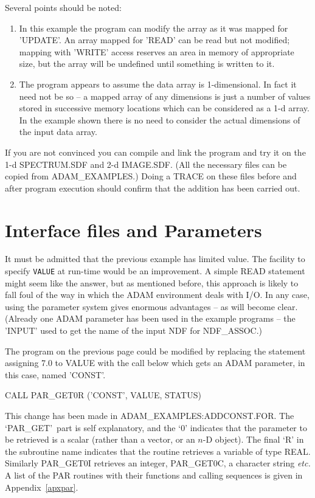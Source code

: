 \documentclass[twoside,11pt,nolof]{starlink}
\begin{document}
Several points should be noted:
\begin{enumerate}
\item In this example the program can modify the array as it was mapped for
'UPDATE'.
An array mapped for 'READ' can  be read but not modified;
mapping with  'WRITE' access reserves an area in memory of appropriate
size, but the array will be undefined until something is written to it.
\item The program appears to assume the data array is 1-dimensional.
In fact it need not be so -- a mapped array of any dimensions is just
a number of values stored in successive memory locations which  can
be considered as a 1-d array.
In the example shown there is no need to consider the actual dimensions
of the input data array.
\end{enumerate}
If you are not convinced you can compile and link the program and try it
on the 1-d SPECTRUM.SDF and 2-d IMAGE.SDF.  (All the necessary files can be
copied from ADAM\_EXAMPLES.)
Doing a TRACE on these files before and after program execution should
confirm that the addition has been carried out.

\newpage
\section{Interface files and Parameters\label{addconst}}

It must be admitted that the previous example has limited value.
The facility to specify \texttt{VALUE} at run-time
would be an improvement.
A simple READ statement might seem like the answer, but as mentioned before,
this approach
is likely to fall foul of the way in which the
ADAM environment deals with I/O.
In any case, using the parameter system gives enormous advantages -- as will
become clear.
(Already one ADAM parameter has been used in the example programs -- the
'INPUT'  used to get the name of the input NDF for NDF\_ASSOC.)

The program on the previous page could be modified by replacing the
statement assigning 7.0 to VALUE with the call below which gets an
ADAM parameter, in this case, named 'CONST'.
\begin{terminalv}
      CALL PAR_GET0R ('CONST', VALUE, STATUS)
\end{terminalv}
This change has been made in ADAM\_EXAMPLES:ADDCONST.FOR.
The `PAR\_GET'\ part is self explanatory,  and the `0' indicates that
the parameter to be retrieved is a scalar
(rather than a vector, or an $n$-D object).
The final `R' in the subroutine
name indicates that the routine retrieves a variable of type REAL.
Similarly PAR\_GET0I retrieves an integer, PAR\_GET0C, a character
string \textit{etc.}
A list of the PAR routines with their functions and calling
sequences is given in Appendix~\ref{apxpar}.
\end{document}
